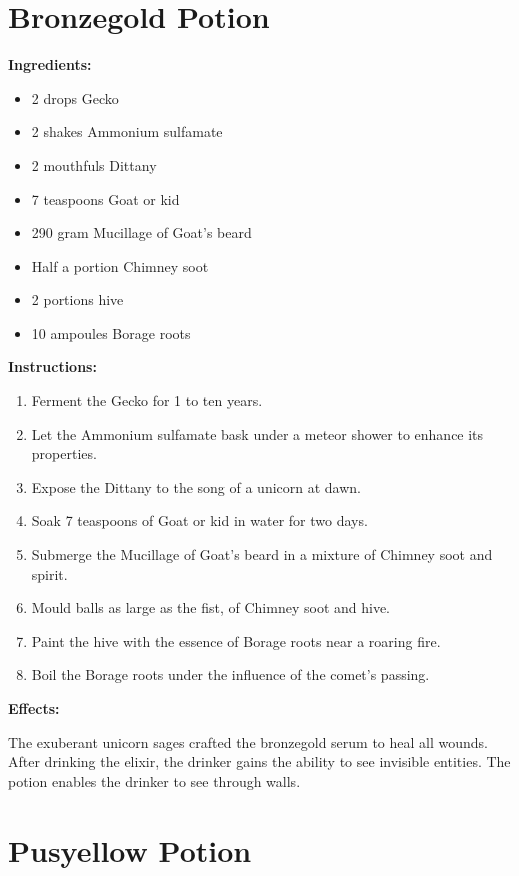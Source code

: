 \documentclass{article}
\begin{document}
\newpage
\section*{Bronzegold Potion}

\textbf{Ingredients:}

\begin{itemize}
  \item 2 drops Gecko
  \item 2 shakes Ammonium sulfamate
  \item 2 mouthfuls Dittany
  \item 7 teaspoons Goat or kid
  \item 290 gram Mucillage of Goat's beard
  \item Half a portion Chimney soot
  \item 2 portions hive
  \item 10 ampoules Borage roots
\end{itemize}

\textbf{Instructions:}

\begin{enumerate}
  \item Ferment the Gecko for 1 to ten years.
  \item Let the Ammonium sulfamate bask under a meteor shower to enhance its properties.
  \item Expose the Dittany to the song of a unicorn at dawn.
  \item Soak 7 teaspoons of Goat or kid in water for two days.
  \item Submerge the Mucillage of Goat's beard in a mixture of Chimney soot and spirit.
  \item Mould balls as large as the fist, of Chimney soot and hive.
  \item Paint the hive with the essence of Borage roots near a roaring fire.
  \item Boil the Borage roots under the influence of the comet’s passing.
\end{enumerate}

\textbf{Effects:}

The exuberant unicorn sages crafted the bronzegold serum to heal all wounds. After drinking the elixir, the drinker gains the ability to see invisible entities. The potion enables the drinker to see through walls.

\newpage
\section*{Pusyellow Potion}
\end{document}
